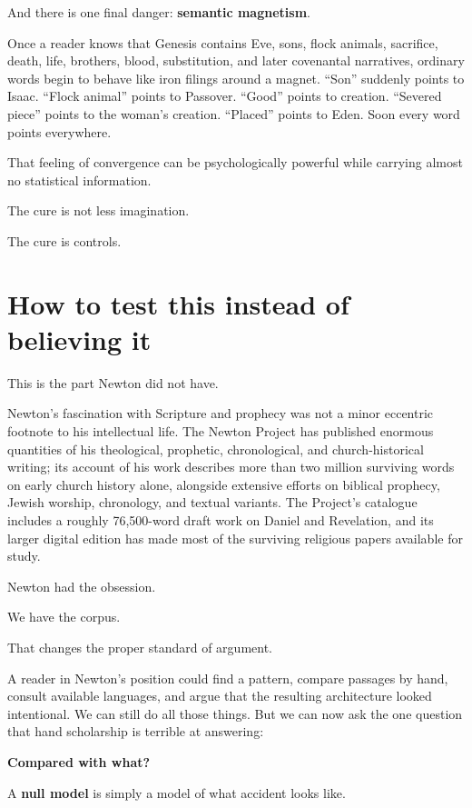 And there is one final danger: \textbf{semantic magnetism}.

Once a reader knows that Genesis contains Eve, sons, flock animals, sacrifice, death, life, brothers, blood, substitution, and later covenantal narratives, ordinary words begin to behave like iron filings around a magnet. ``Son'' suddenly points to Isaac. ``Flock animal'' points to Passover. ``Good'' points to creation. ``Severed piece'' points to the woman's creation. ``Placed'' points to Eden. Soon every word points everywhere.

That feeling of convergence can be psychologically powerful while carrying almost no statistical information.

The cure is not less imagination.

The cure is controls.

\section*{How to test this instead of believing it}

This is the part Newton did not have.

Newton's fascination with Scripture and prophecy was not a minor eccentric footnote to his intellectual life. The Newton Project has published enormous quantities of his theological, prophetic, chronological, and church-historical writing; its account of his work describes more than two million surviving words on early church history alone, alongside extensive efforts on biblical prophecy, Jewish worship, chronology, and textual variants. The Project's catalogue includes a roughly 76,500-word draft work on Daniel and Revelation, and its larger digital edition has made most of the surviving religious papers available for study.\cite{NewtonProject}

Newton had the obsession.

We have the corpus.

That changes the proper standard of argument.

A reader in Newton's position could find a pattern, compare passages by hand, consult available languages, and argue that the resulting architecture looked intentional. We can still do all those things. But we can now ask the one question that hand scholarship is terrible at answering:

\textbf{Compared with what?}

A \textbf{null model} is simply a model of what accident looks like.

